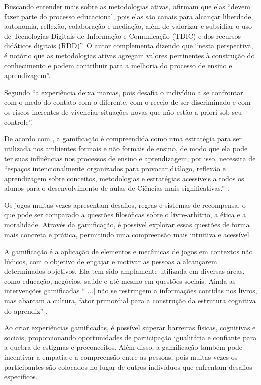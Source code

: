 Buscando entender mais sobre as metodologias ativas,  afirmam que elas ``devem fazer parte do processo educacional, pois elas são canais para alcançar liberdade, autonomia, reflexão, colaboração e mediação, além de valorizar e subsidiar o uso de Tecnologias Digitais de Informação e Comunicação (TDIC) e dos recursos didáticos digitais (RDD)''. O autor complementa dizendo que ``nesta perspectiva, é notório que as metodologias ativas agregam valores pertinentes à construção do conhecimento e podem contribuir para a melhoria do processo de ensino e aprendizagem''.

Segundo  ``a experiência deixa marcas, pois desafia o indivíduo a se confrontar com o medo do contato com o diferente, com o receio de ser discriminado e com os riscos inerentes de vivenciar situações novas que não estão a priori sob seu controle''.

De acordo com , a gamificação é compreendida como uma estratégia para ser utilizada nos ambientes formais e não formais de ensino, de modo que ela pode ter suas influências nos processos de ensino e aprendizagem, por isso, necessita de ``espaços intencionalmente organizados para provocar diálogo, reflexão e aprendizagem sobre conceitos, metodologias e estratégias acessíveis a todos os alunos para o desenvolvimento de aulas de Ciências mais significativas.'' \cite[p. 89]{SILVA2019}.

Os jogos muitas vezes apresentam desafios, regras e sistemas de recompensa, o que pode ser comparado a questões filosóficas sobre o livre-arbítrio, a ética e a moralidade. Através da gamificação, é possível explorar essas questões de forma mais concreta e prática, permitindo uma compreensão mais intuitiva e acessível.

A gamificação é a aplicação de elementos e mecânicas de jogos em contextos não lúdicos, com o objetivo de engajar e motivar as pessoas a alcançarem determinados objetivos. Ela tem sido amplamente utilizada em diversas áreas, como educação, negócios, saúde e até mesmo em questões sociais. Ainda as intervenções gamificadas ``[...] não se restringem a informações contidas nos livros, mas abarcam a cultura, fator primordial para a construção da estrutura cognitiva do aprendiz'' \cite[p. 17]{SILVAPIRES2020}.

Ao criar experiências gamificadas, é possível superar barreiras físicas, cognitivas e sociais, proporcionando oportunidades de participação igualitária e confiante para a quebra de estigmas e preconceitos. Além disso, a gamificação também pode incentivar a empatia e a compreensão entre as pessoas, pois muitas vezes os participantes são colocados no lugar de outros indivíduos que enfrentam desafios específicos.

